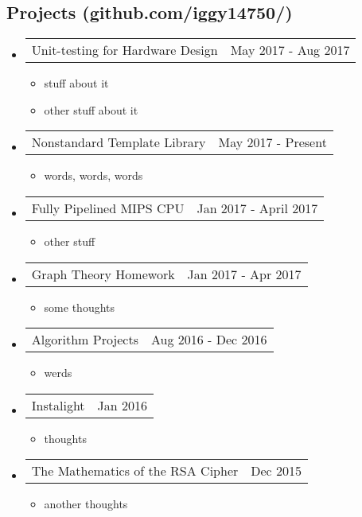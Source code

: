 \documentclass[18pt]{article}
\makeatletter
\providecommand{\tightlist}{
    \setlength{\itemsep}{0pt}\setlength{\parskip}{0pt}
}
\providecommand{\datetable}[2]{
    \begin{tabular*}{\textwidth}{r @{\extracolsep{\fill}} l}
        #1 & #2
    \end{tabular*}
}
\makeatother
\begin{document}
  \subsection*{Projects (github.com/iggy14750/)}\label{projects}
    \begin{itemize}\tightlist
        
      \item \datetable{Unit-testing for Hardware Design}{May 2017 - Aug 2017}
      \begin{itemize}\tightlist
        \item stuff about it
        \item other stuff about it
      \end{itemize}
        
      \item \datetable{Nonstandard Template Library}{May 2017 - Present}
      \begin{itemize}\tightlist
        \item words, words, words
      \end{itemize}
          
      \item \datetable{Fully Pipelined MIPS CPU}{Jan 2017 - April 2017}
      \begin{itemize}\tightlist
        \item other stuff
      \end{itemize}
      
      \item \datetable{Graph Theory Homework}{Jan 2017 - Apr 2017}
      \begin{itemize}\tightlist
        \item some thoughts
      \end{itemize}
      
      \item \datetable{Algorithm Projects}{Aug 2016 - Dec 2016}
        \begin{itemize}\tightlist
          \item werds
        \end{itemize}
        
      \item \datetable{Instalight}{Jan 2016}
      \begin{itemize}\tightlist
        \item thoughts
      \end{itemize}
      
      \item \datetable{The Mathematics of the RSA Cipher}{Dec 2015}
      \begin{itemize}\tightlist
        \item another thoughts
      \end{itemize}
  \end{itemize}
    
\end{document}
